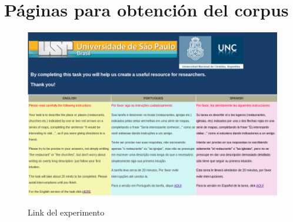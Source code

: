\appendix




\chapter{P\'aginas para obtenci\'on del corpus}
\label{corpus-apendice}


%

\begin{figure}[ht]
\begin{center}
\includegraphics[width=13cm]{images/pagPrincipal.png}\\[0pt]
\caption{Link del experimento}
\label{fig-pagPrincipal}
\end{center}
\end{figure}

%


